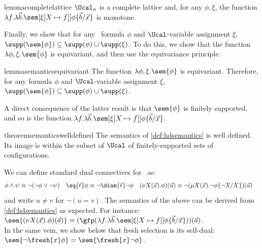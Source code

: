 \begin{restatable}{lemma}{completelattice}\label{lem:completelattice}
$\Ucal_n$ is a complete lattice and,
for any $\phi, \xi$,
 the function $\lambda f.\lambda \vec b.\sem[{\xi[X\mapsto f]}]{\phi\{\vec b/\vec x\}}$ is monotone.
\end{restatable}

Finally, we show that for any \fhml\ formula $\phi$ and $\Ucal$-variable assignment $\xi$,  $\supp(\sem{\phi}) \subseteq \supp(\phi) \cup \supp(\xi)$. 
To do this, we show that the function $\lambda \phi, \xi.\sem{\phi}$ is equivariant, and then use the equivariance principle.

\begin{restatable}{lemma}{semanticsequivariant}\label{lem:semanticsequivariant}
    The function $\lambda \phi, \xi.\sem{\phi}$ is equivariant.
    Therefore, 
for any formula $\phi$ and $\Ucal$-variable assignment $\xi$, $\supp(\sem{\phi}) \subseteq \supp(\phi) \cup \supp(\xi)$.
\end{restatable}


A direct consequence of the latter result is that $\sem{\phi}$ is finitely supported, and so is the function $\lambda f.\lambda \vec b.\sem[{\xi[X \mapsto f]}]{\phi\{\vec b/\vec x\}}$.

\begin{restatable}{theorem}{semanticswelldefined}\label{thm:semanticswelldefined}
The semantics of \cref{def:hdsemantics} is well defined. Its image is within the subset of $\Ucal$ of finitely-supported sets of configurations.
\end{restatable}

\begin{remark}\label{rem:derived}
  We can define standard dual connectives for \fhml\ as:
  \begin{align*}
    \phi\land\psi &\equiv \lnot(\lnot\phi\lor\lnot\psi) &
    \sq{\ell}\phi &\equiv \lnot\diam{\ell}\lnot\phi &                        (\nu X(\vec x).\phi)(\vec u) &\equiv \lnot(\mu X(\vec x).\lnot\phi\{\lnot X/X\})(\vec u)
  \end{align*}
  and write $u\neq v$ for $\lnot(u=v)$. The semantics of the above can be derived from \cref{def:hdsemantics} as expected. For instance:\
$
  \sem{(\nu X(\vec x).\phi)(\vec a)} = (\gfp(\lambda f.\lambda\vec b. \sem[{\xi[X\mapsto f]}]{\phi\{\vec b / \vec x\}}))(\vec a)
  $.\\
  In the same vein,
  we show below that fresh selection is its self-dual:
  $\sem{\lnot\fresh{x}\phi}=\sem{\fresh{x}\lnot\phi}$.
\end{remark}

